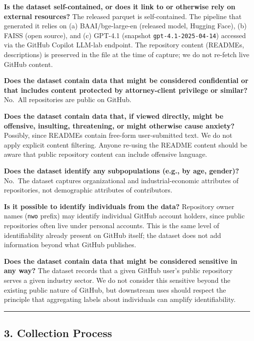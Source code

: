 \textbf{Is the dataset self-contained, or does it link to or otherwise rely
on external resources?}
The released parquet is self-contained. The pipeline that generated it
relies on (a) BAAI/bge-large-en (released model, Hugging Face),
(b) FAISS (open source), and (c) GPT-4.1 (snapshot
\texttt{gpt-4.1-2025-04-14}) accessed via the GitHub Copilot LLM-lab
endpoint. The repository content (READMEs, descriptions) is preserved
in the file at the time of capture; we do not re-fetch live GitHub
content.

\textbf{Does the dataset contain data that might be considered confidential
or that includes content protected by attorney-client privilege or
similar?}
No.~All repositories are public on GitHub.

\textbf{Does the dataset contain data that, if viewed directly, might be
offensive, insulting, threatening, or might otherwise cause anxiety?}
Possibly, since READMEs contain free-form user-submitted text. We do
not apply explicit content filtering. Anyone re-using the README
content should be aware that public repository content can include
offensive language.

\textbf{Does the dataset identify any subpopulations (e.g., by age, gender)?}
No.~The dataset captures organizational and industrial-economic
attributes of repositories, not demographic attributes of contributors.

\textbf{Is it possible to identify individuals from the data?}
Repository owner names (\texttt{nwo} prefix) may identify individual GitHub
account holders, since public repositories often live under personal
accounts. This is the same level of identifiability already present
on GitHub itself; the dataset does not add information beyond what
GitHub publishes.

\textbf{Does the dataset contain data that might be considered sensitive in
any way?}
The dataset records that a given GitHub user's public repository
serves a given industry sector. We do not consider this sensitive
beyond the existing public nature of GitHub, but downstream uses
should respect the principle that aggregating labels about individuals
can amplify identifiability.

\begin{center}\rule{0.5\linewidth}{0.5pt}\end{center}

\hypertarget{collection-process}{%
\subsection{3. Collection Process}\label{collection-process}}

